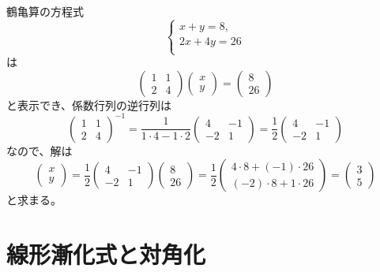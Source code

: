 \begin{example}
鶴亀算の方程式
$$
\begin{cases}
x+y = 8, \\
2 x+4 y = 26 \\
\end{cases}
$$
は
$$
\begin{pmatrix}1 & 1 \\ 2 & 4\end{pmatrix}\begin{pmatrix}x \\ y\end{pmatrix}
= \begin{pmatrix}8 \\ 26\end{pmatrix}
$$
と表示でき、係数行列の逆行列は
$$
\begin{pmatrix}1 & 1 \\ 2 & 4\end{pmatrix}^{-1}
= \frac{1}{1\cdot 4-1\cdot 2}\begin{pmatrix}4 & -1 \\ -2 & 1\end{pmatrix}
= \frac{1}{2}\begin{pmatrix}4 & -1 \\ -2 & 1\end{pmatrix}
$$
なので、解は
$$
\begin{pmatrix}x \\ y\end{pmatrix}
= \frac{1}{2}\begin{pmatrix}4 & -1 \\ -2 & 1\end{pmatrix}\begin{pmatrix}8 \\ 26\end{pmatrix}
= \frac{1}{2}\begin{pmatrix}4\cdot 8+(-1)\cdot 26 \\ (-2)\cdot 8+1\cdot 26\end{pmatrix}
= \begin{pmatrix}3 \\ 5\end{pmatrix}
$$
と求まる。
\end{example}

\section{線形漸化式と対角化}

